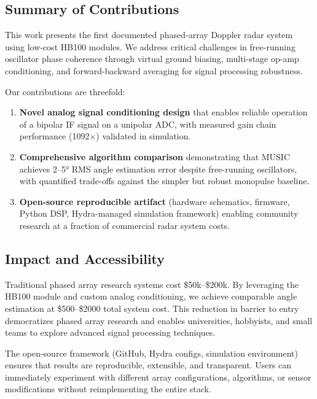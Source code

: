 \documentclass[10pt,a4paper]{article}
\begin{document}
\subsection{Summary of Contributions}

This work presents the first documented phased-array Doppler radar system using low-cost HB100 modules.
We address critical challenges in free-running oscillator phase coherence through virtual ground biasing,
multi-stage op-amp conditioning, and forward-backward averaging for signal processing robustness.

Our contributions are threefold:

\begin{enumerate}
\item \textbf{Novel analog signal conditioning design} that enables reliable operation of a bipolar IF signal
  on a unipolar ADC, with measured gain chain performance (1092$\times$) validated in simulation.

\item \textbf{Comprehensive algorithm comparison} demonstrating that MUSIC achieves 2--5° RMS angle estimation
  error despite free-running oscillators, with quantified trade-offs against the simpler but robust monopulse baseline.

\item \textbf{Open-source reproducible artifact} (hardware schematics, firmware, Python DSP, Hydra-managed
  simulation framework) enabling community research at a fraction of commercial radar system costs.
\end{enumerate}

\subsection{Impact and Accessibility}

Traditional phased array research systems cost \$50k--\$200k. By leveraging the HB100 module and custom
analog conditioning, we achieve comparable angle estimation at \$500--\$2000 total system cost. This reduction
in barrier to entry democratizes phased array research and enables universities, hobbyists, and small teams
to explore advanced signal processing techniques.

The open-source framework (GitHub, Hydra configs, simulation environment) ensures that
results are reproducible, extensible, and transparent. Users can immediately experiment with different
array configurations, algorithms, or sensor modifications without reimplementing the entire stack.
\end{document}
